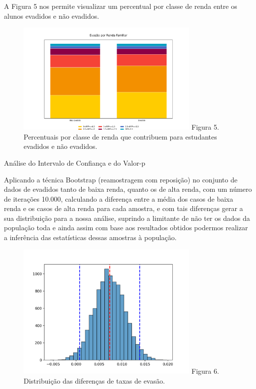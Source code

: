 \documentclass[conference]{IEEEtran}
\begin{document}
A Figura 5 nos permite visualizar um percentual por classe de renda entre os alunos evadidos e não evadidos.\par

\begin{figure}[h]
    \includegraphics[width=8.9cm]{figs/figura-6.png}
    \centering
    Figura 5. Percentuais por classe de renda que contribuem para estudantes evadidos e não evadidos.
\end{figure}

Análise do Intervalo de Confiança e do Valor-p\par

Aplicando a técnica Bootstrap (reamostragem com reposição) no conjunto de dados de evadidos tanto de baixa renda, quanto os de alta renda, com um número de iterações 10.000, calculando a diferença entre a média dos casos de baixa renda e os casos de alta renda para cada amostra, e com tais diferenças gerar a sua distribuição para a nossa análise, suprindo a limitante de não ter os dados da população toda e ainda assim com base aos resultados obtidos podermos realizar a inferência das estatísticas dessas amostras à população.\par

\begin{figure}[h]
    \includegraphics[width=8.9cm]{figs/figura-5.png}
    \centering
    Figura 6. Distribuição das diferenças de taxas de evasão.
\end{figure}
\end{document}
